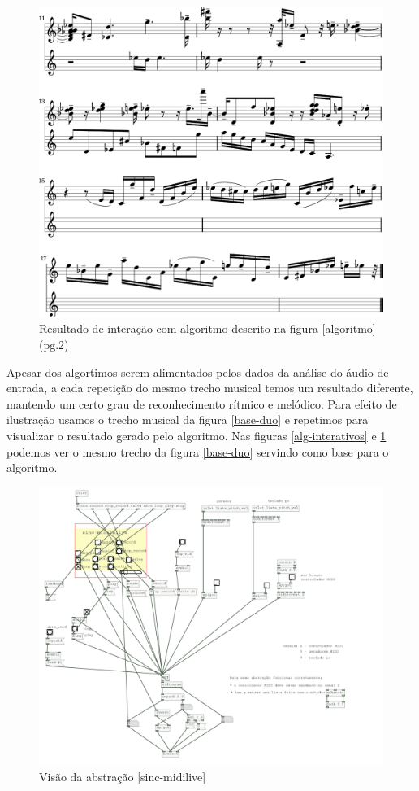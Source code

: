 \documentclass[draft]{ppgmus}
\begin{document}
\begin{figure}
\includegraphics[scale=.5]{alg-interativos2}
\caption{Resultado de interação com algoritmo descrito na figura \ref{algoritmo}(pg.2)}
\label{alg-interativos2}
\end{figure}

Apesar dos algortimos serem alimentados pelos dados da análise do áudio de entrada, a cada repetição
do mesmo trecho musical temos um resultado diferente, mantendo um certo grau de reconhecimento
rítmico e melódico. Para efeito de ilustração usamos o trecho musical da figura \ref{base-duo} e repetimos
 para visualizar o resultado gerado pelo algoritmo. Nas figuras \ref{alg-interativos} e \ref{alg-interativos2} podemos
ver o mesmo trecho da figura \ref{base-duo} servindo como base para o algoritmo.


\begin{figure}
\includegraphics[scale=.5]{sinc-midilive}
\caption{Visão da abstração [sinc-midilive]}
\label{sinc-midilive}
\end{figure}
\end{document}
